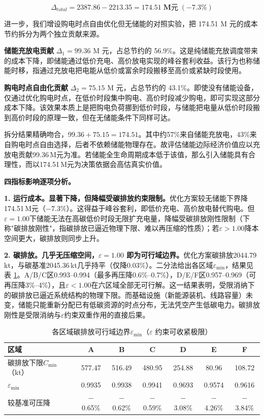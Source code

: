 \begin{equation}
\Delta_{total} = 2387.86 - 2213.35 = \mathbf{174.51\;\text{M元}}\;(-7.3\%)
\end{equation}

进一步，我们增设购电时点自由优化但无储能的对照实验，把 174.51 M 元的成本节约拆分为两个独立贡献来源。

\textbf{储能充放电贡献} $\Delta_1 = 99.36$ M 元，占总节约的 56.9\%。这是纯储能充放调度带来的成本下降，即储能通过低价充电、高价放电实现的峰谷套利收益。该行为也称储能时移，指通过充放电把电能从低价或富余时段搬移至高价或紧缺时段使用。

\textbf{购电时点自由化贡献} $\Delta_2 = 75.15$ M 元，占总节约的 43.1\%。即使没有储能设备，仅通过优化购电时点，在低价时段集中购电、高价时段减少购电，即可实现这部分成本下降。该效果本质上是把购电负荷挪到低价时段，与储能把电量从低价时段搬到高价时段的原理一致，但在无储能条件下同样可达。

拆分结果精确吻合，$99.36+75.15=174.51$。其中约57\%来自储能充放电，43\%来自购电时点自由选择，后者不依赖储能物理存在。故评估储能边际经济价值应以充放电贡献99.36\,M元为准。若储能全生命周期成本低于该值，那么引入储能具有合理性，而以174.51\,M元为决策依据会高估真实价值。

\medskip\noindent\textbf{四指标影响逐项分析。}

\textbf{1. 运行成本。显著下降，但降幅受碳排放约束限制。}优化方案较无储能下界降174.51\,M元（$-7.3\%$）。这得益于峰谷套利，即低价充电、高价放电替代购电。但$\varepsilon=1.00$下储能无法在高碳低价时段无限扩充电量，降幅受碳排放刚性限制（下称"碳排放刚性"，指碳排放已逼近物理下限、难以再压缩的性质）；若$\varepsilon>1.00$降本空间更大，碳排放则同步上升。

\textbf{2. 碳排放。几乎无压缩空间，$\varepsilon=1.00$ 即为可行域边界。}优化方案碳排放2044.79\,kt，与碳基准2045.36\,kt几乎持平（仅降0.03\%）。二分法给出各区域$\varepsilon_{\min}$，结果见表 \ref{tab:s3-emin}。A/B/C区0.993--0.994（最多再压降0.6\%--0.7\%），D/E/F区0.957--0.969（可再压降3\%--4\%），且$\varepsilon<1.00$在六区域全部无可行解。这一结果表明，受限消纳下的碳排放已逼近系统结构的物理下限。而基础设施（新能源装机、线路容量）未变，储能只能重新分配已有低碳资源的时点分布，无法凭空产生低碳电力。碳排放刚性是受限消纳与$\varepsilon$约束双重作用的直接后果。

\begin{table}[ht]
\centering
\footnotesize
\caption{各区域碳排放可行域边界$\varepsilon_{\min}$（$\varepsilon$ 约束可收紧极限）}
\label{tab:s3-emin}
\begin{tabular}{lcccccc}
\toprule
区域 & A & B & C & D & E & F \\
\midrule
碳排放下限$C_{\min}$（kt） & 577.47 & 516.49 & 480.95 & 254.88 & 80.96 & 108.72 \\
$\varepsilon_{\min}$ & 0.9935 & 0.9938 & 0.9941 & 0.9693 & 0.9574 & 0.9616 \\
较基准可压降 & $-$0.65\% & $-$0.62\% & $-$0.59\% & $-$3.08\% & $-$4.26\% & $-$3.84\% \\
\bottomrule
\end{tabular}
\end{table}

